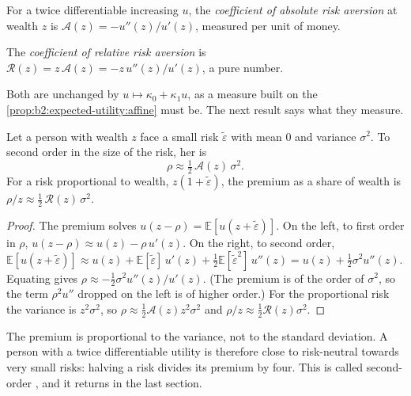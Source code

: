 \begin{definition}\label{def:b2:expected-utility:ara}
For a twice differentiable increasing $u$, the \emph{coefficient of absolute risk
aversion} at wealth $z$ is $\mathcal{A}(z) =
-u''(z)/u'(z)$, measured per unit of money.
\end{definition}

\begin{definition}\label{def:b2:expected-utility:rra}
The \emph{coefficient of relative risk aversion} is
$\mathcal{R}(z) = z\,\mathcal{A}(z) = -z\,u''(z)/u'(z)$, a pure number.
\end{definition}

Both are unchanged by $u \mapsto \kappa_0 + \kappa_1 u$, as a measure built on the
\cref{prop:b2:expected-utility:affine} must be. The next result says what they measure.

\begin{proposition}\label{prop:b2:expected-utility:small-risk}
Let a person with wealth $z$ face a small risk $\tilde\varepsilon$ with mean $0$ and variance
$\sigma^2$. To second order in the size of the risk, her  is
\[
\rho \approx \tfrac12\,\mathcal{A}(z)\,\sigma^2 .
\]
For a risk proportional to wealth, $z(1 + \tilde\varepsilon)$, the premium as a share of wealth is
$\rho/z \approx \tfrac12\,\mathcal{R}(z)\,\sigma^2$.
\end{proposition}

\begin{proof}
The premium solves $u(z - \rho) = \mathbb{E}[u(z + \tilde\varepsilon)]$. On the left, to first order
in $\rho$, $u(z - \rho) \approx u(z) - \rho\,u'(z)$. On the right, to second order,
$\mathbb{E}[u(z + \tilde\varepsilon)] \approx u(z) + \mathbb{E}[\tilde\varepsilon]\,u'(z) +
\tfrac12\mathbb{E}[\tilde\varepsilon^2]\,u''(z) = u(z) + \tfrac12\sigma^2 u''(z)$. Equating gives $\rho
\approx -\tfrac12\sigma^2 u''(z)/u'(z)$. (The premium is of the order of $\sigma^2$, so the term
$\rho^2 u''$ dropped on the left is of higher order.) For the proportional risk the variance is
$z^2\sigma^2$, so $\rho \approx \tfrac12\mathcal{A}(z) z^2\sigma^2$ and $\rho/z \approx
\tfrac12\mathcal{R}(z)\sigma^2$.
\end{proof}

The premium is proportional to the variance, not to the standard deviation. A person with a twice
differentiable utility is therefore close to risk-neutral towards very small risks: halving a risk
divides its premium by four. This is called second-order , and it returns in the last
section.

